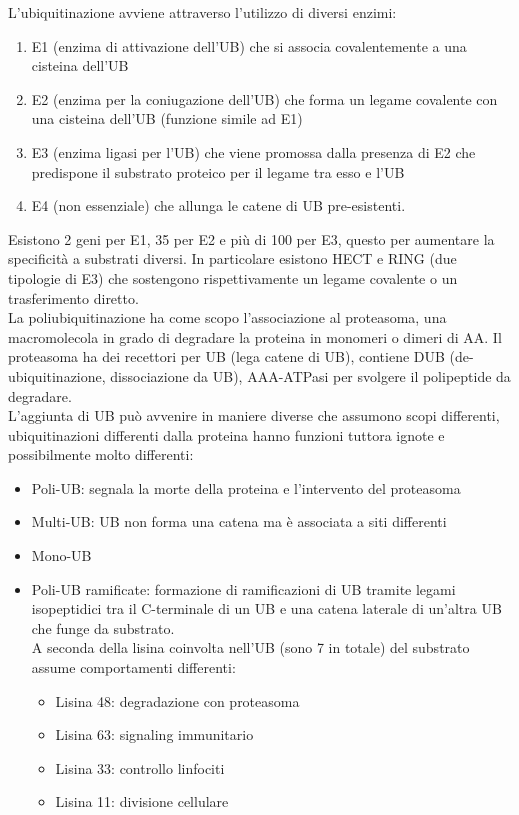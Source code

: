         L'ubiquitinazione avviene attraverso l'utilizzo di diversi enzimi:
        \begin{enumerate}
            \item E1 (enzima di attivazione dell'UB) che si associa covalentemente a una cisteina dell'UB
            \item E2 (enzima per la coniugazione dell'UB) che forma un legame covalente con una cisteina dell'UB (funzione simile ad E1)
            \item E3 (enzima ligasi per l'UB) che viene promossa dalla presenza di E2 che predispone il substrato proteico per il legame tra esso e l'UB
            \item E4 (non essenziale) che allunga le catene di UB pre-esistenti.
        \end{enumerate}
        Esistono 2 geni per E1, 35 per E2 e più di 100 per E3, questo per aumentare la specificità a substrati diversi. In particolare esistono HECT e RING (due tipologie di E3) che sostengono rispettivamente un legame covalente o un trasferimento diretto. \\
        
        La poliubiquitinazione ha come scopo l'associazione al proteasoma, una macromolecola in grado di degradare la proteina in monomeri o dimeri di AA. Il proteasoma ha dei recettori per UB (lega catene di UB), contiene DUB (de-ubiquitinazione, dissociazione da UB), AAA-ATPasi per svolgere il polipeptide da degradare.\\
        L'aggiunta di UB può avvenire in maniere diverse che assumono scopi differenti, ubiquitinazioni differenti dalla proteina hanno funzioni tuttora ignote e possibilmente molto differenti:
        \begin{itemize}
            \item Poli-UB: segnala la morte della proteina e l'intervento del proteasoma
            \item Multi-UB: UB non forma una catena ma è associata a siti differenti
            \item Mono-UB
            \item Poli-UB ramificate: formazione di ramificazioni di UB tramite legami isopeptidici tra il C-terminale di un UB e una catena laterale di un'altra UB che funge da substrato.\\
            A seconda della lisina coinvolta nell'UB (sono 7 in totale) del substrato assume comportamenti differenti: 
                \begin{itemize}
                    \item Lisina 48: degradazione con proteasoma
                    \item Lisina 63: signaling immunitario
                    \item Lisina 33: controllo linfociti
                    \item Lisina 11: divisione cellulare
                \end{itemize}
        \end{itemize}

